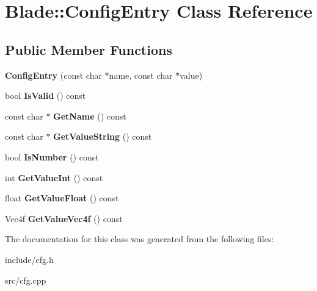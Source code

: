 \hypertarget{class_blade_1_1_config_entry}{}\section{Blade\+:\+:Config\+Entry Class Reference}
\label{class_blade_1_1_config_entry}
\subsection*{Public Member Functions}
\begin{DoxyCompactItemize}
\item 
\mbox{\label{class_blade_1_1_config_entry_a0c8fb4e9b8a8e9d3b95cf13cc2ccefdd}} 
{\bfseries Config\+Entry} (const char $\ast$name, const char $\ast$value)
\item 
\mbox{\label{class_blade_1_1_config_entry_ab1916e50a587efb55c4c427e08bf46f6}} 
bool {\bfseries Is\+Valid} () const
\item 
\mbox{\label{class_blade_1_1_config_entry_aff9873cf99476f3f1394e3337b5eeb14}} 
const char $\ast$ {\bfseries Get\+Name} () const
\item 
\mbox{\label{class_blade_1_1_config_entry_a7a02a47d5a0ab31d7134a779032bd102}} 
const char $\ast$ {\bfseries Get\+Value\+String} () const
\item 
\mbox{\label{class_blade_1_1_config_entry_a6d262b3cff18da5bf4b0f9f98daf314b}} 
bool {\bfseries Is\+Number} () const
\item 
\mbox{\label{class_blade_1_1_config_entry_a8be0efa054b6eaba44caf90d4cae0dbd}} 
int {\bfseries Get\+Value\+Int} () const
\item 
\mbox{\label{class_blade_1_1_config_entry_aa3065619dcf710e02fbac73e5f118383}} 
float {\bfseries Get\+Value\+Float} () const
\item 
\mbox{\label{class_blade_1_1_config_entry_aaf1d4c5811a52b103492cda170442c6d}} 
Vec4f {\bfseries Get\+Value\+Vec4f} () const
\end{DoxyCompactItemize}


The documentation for this class was generated from the following files\+:\begin{DoxyCompactItemize}
\item 
include/cfg.\+h\item 
src/cfg.\+cpp\end{DoxyCompactItemize}
